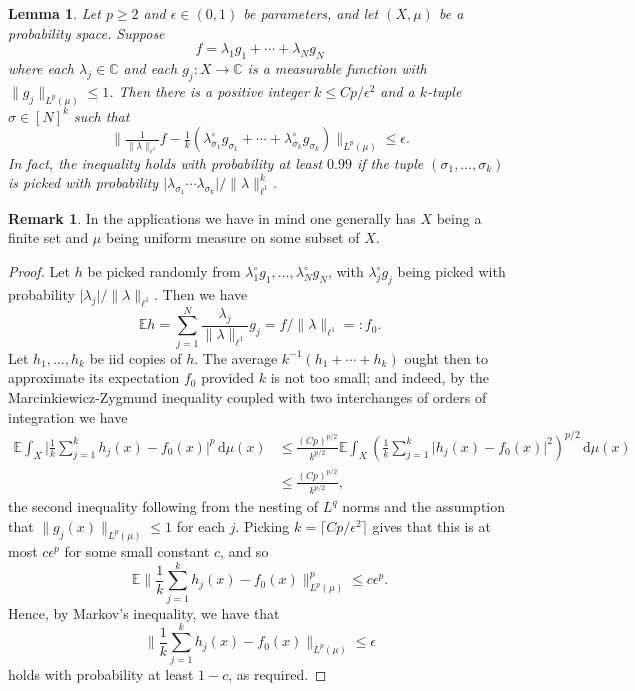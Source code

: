 \documentclass[12pt,a4paper,reqno]{amsart}
\numberwithin{equation}{section}
\theoremstyle{plain}
\newtheorem{lemma}[subsection]{Lemma}
\theoremstyle{definition}
\newtheorem{remark}[subsection]{Remark}
\renewcommand{\leq}{\leqslant}
\renewcommand{\geq}{\geqslant}
\def\E{\mathbb{E}}
\def\C{\mathbb{C}}
\newcommand{\ud}{\,\mathrm{d}}
\providecommand{\abs}[1]{\lvert#1\rvert}
\providecommand{\norm}[1]{\lVert #1 \rVert}
\theoremstyle{plain}
\begin{document}
\begin{lemma}\label{lemma:approxLp}
Let $p \geq 2$ and $\epsilon \in (0,1)$ be parameters, and let $(X,\mu)$ be a probability space. Suppose
\[ f = \lambda_1 g_1 + \cdots + \lambda_N g_N \]
where each $\lambda_j \in \C$ and each $g_j : X \to \C$ is a measurable function with $\norm{g_j}_{L^p(\mu)} \leq 1$. Then there is a positive integer $k \leq Cp/\epsilon^2$ and a $k$-tuple $\sigma \in [N]^k$ such that
\[ \norm{ \tfrac{1}{\norm{\lambda}_{\ell^1}}f - \tfrac{1}{k}( \lambda_{\sigma_1}^{\circ} g_{\sigma_1} + \cdots + \lambda_{\sigma_k}^{\circ} g_{\sigma_k} ) }_{L^p(\mu)} \leq \epsilon. \]
In fact, the inequality holds with probability at least $0.99$ if the tuple $(\sigma_1, \ldots, \sigma_k)$ is picked with probability $\abs{\lambda_{\sigma_1} \cdots \lambda_{\sigma_k}}/\norm{\lambda}_{\ell^1}^k$.
\end{lemma}
\begin{remark}
In the applications we have in mind one generally has $X$ being a finite set and $\mu$ being uniform measure on some subset of $X$.
\end{remark}
\begin{proof}
Let $h$ be picked randomly from $\lambda_1^{\circ} g_1, \ldots, \lambda_N^{\circ} g_N$, with $\lambda_j^{\circ} g_j$ being picked with probability $\abs{\lambda_j}/\norm{\lambda}_{\ell^1}$. Then we have
\[ \E h = \sum_{j=1}^N \frac{\lambda_j}{\norm{\lambda}_{\ell^1}} g_j = f/\norm{\lambda}_{\ell^1} =: f_0. \]
Let $h_1,\ldots,h_k$ be iid copies of $h$. The average $k^{-1}(h_1 + \cdots + h_k)$ ought then to approximate its expectation $f_0$ provided $k$ is not too small; and indeed, by the Marcinkiewicz-Zygmund inequality coupled with two interchanges of orders of integration we have
\begin{align}
\E \int_{X} \abs{ \frac{1}{k} \sum_{j=1}^k h_j(x) - f_0(x) }^p \ud\mu(x) &\leq \frac{(Cp)^{p/2}}{k^{p/2}} \E \int_{X} \left(\frac{1}{k}\sum_{j=1}^k \abs{ h_j(x) - f_0(x) }^2 \right)^{p/2} \ud\mu(x) \nonumber\\
&\leq \frac{(Cp)^{p/2}}{k^{p/2}}, \label{eqn:M-Z}
\end{align}
the second inequality following from the nesting of $L^q$ norms and the assumption that $\norm{g_j(x)}_{L^p(\mu)} \leq 1$ for each $j$. Picking $k = \lceil{Cp/\epsilon^2}\rceil$ gives that this is at most $c\epsilon^p$ for some small constant $c$, and so
\[ \E \norm{\frac{1}{k} \sum_{j=1}^k h_j(x) - f_0(x)}_{L^p(\mu)}^p \leq c\epsilon^p. \]
Hence, by Markov's inequality, we have that
\[ \norm{\frac{1}{k} \sum_{j=1}^k h_j(x) - f_0(x)}_{L^p(\mu)} \leq \epsilon \]
holds with probability at least $1-c$, as required.
\end{proof}
\end{document}
